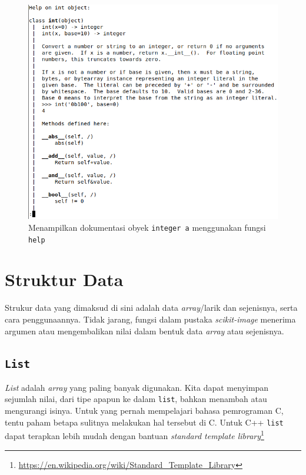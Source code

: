 \begin{figure}
  \begin{center}
    \includegraphics[scale=.5]{pics/interpreter4.png}
    \caption{Menampilkan dokumentasi obyek \texttt{integer a} menggunakan fungsi \texttt{help}}
    \label{fig:doc2}
  \end{center}
\end{figure}

\section{Struktur Data}
Strukur data yang dimaksud di sini adalah data \textit{array}/larik dan sejenisnya, serta cara penggunaannya. Tidak jarang, fungsi dalam pustaka \textit{scikit-image} menerima argumen atau mengembalikan nilai dalam bentuk data \textit{array} atau sejenisnya. 
\subsection{\texttt{List}}
\textit{List} adalah \textit{array} yang paling banyak digunakan. Kita dapat menyimpan sejumlah nilai, dari tipe apapun ke dalam \texttt{list}, bahkan menambah atau mengurangi isinya. Untuk yang pernah mempelajari bahasa pemrograman C, tentu paham betapa sulitnya melakukan hal tersebut di C. Untuk C++ \texttt{list} dapat terapkan lebih mudah dengan bantuan \textit{standard template library}\footnote{\url{https://en.wikipedia.org/wiki/Standard\_Template\_Library}}

